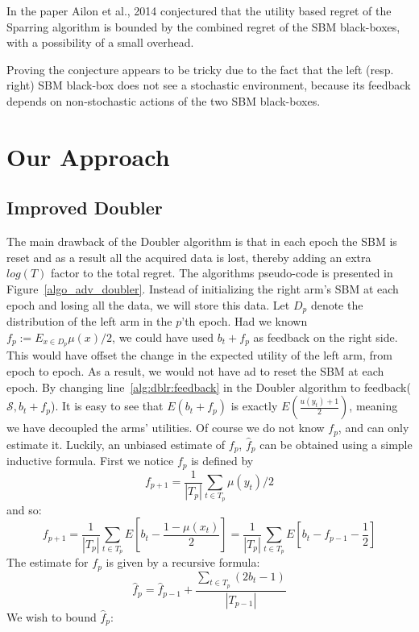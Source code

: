 \documentclass{llncs}
\begin{document}
		
	\begin{conjecture}
 		In the paper Ailon et al., 2014 conjectured that the utility based regret of the Sparring algorithm is bounded by the combined regret of the SBM black-boxes, with a possibility of a small overhead.
 	\end{conjecture}	
 	Proving the conjecture appears to be tricky due to the fact
that the left (resp. right) SBM black-box does not see a stochastic environment, because its feedback depends on non-stochastic actions of the two SBM black-boxes. 
	
\section{Our Approach}	
	
	\subsection{Improved Doubler}
	The main drawback of the Doubler algorithm is that in each epoch the SBM is reset and as a result all the acquired data is lost, thereby adding an extra $log(T)$ factor to the total regret.
	The algorithms pseudo-code is presented in Figure~\ref{algo_adv_doubler}.
	Instead of initializing the right arm’s SBM at each epoch and losing all the data, we will store this data.
	Let $D_p$ denote the distribution of the left arm in the $p$’th epoch. 
	Had we known $f_p := E_{x\in D_p} \mu(x)/2$, we could have used $b_t + f_p$ as feedback on the right side.
	This would have offset the change in the expected utility of the left arm, from epoch to epoch.
	As a result, we would not have ad to reset the SBM at each epoch.
	By changing line~\ref{alg:dblr:feedback} in the Doubler algorithm to feedback($\mathcal{S}, b_t + f_p $).
	It is easy to see that $E(b_t + f_p )$ is exactly $E(\frac{u(y_t)+1}{2})$, meaning we have decoupled the arms' utilities.
	Of course we do not know $f_p$, and can only estimate it.
	Luckily, an unbiased estimate of $f_p$, $\hat{f}_p$ can be obtained using a simple inductive formula.
	First we notice $f_p$ is defined by 
	\begin{equation}
	f_{p+1} = \frac{1}{|T_p|}\sum\limits_{t\in T_p} \mu(y_t)/2
	\end{equation}
	and so:
	$$
	f_{p+1} = 
		\frac{1}{|T_p|}\sum\limits_{t\in T_p} E[b_t - \frac{1-\mu(x_t)}{2}] = \frac{1}{|T_p|}\sum\limits_{t\in T_p} E[b_t - f_{p-1}-\frac{1}{2}]
	$$
	The estimate for $f_p$ is given by a recursive formula:
	\begin{equation}
	\hat{f}_p=\hat{f}_{p-1} + \frac{\sum\limits_{t\in T_p} (2b_t -1)}{|T_{p-1}|}
	\end{equation}
	We wish to bound $\hat{f}_p$:
	
\end{document}
